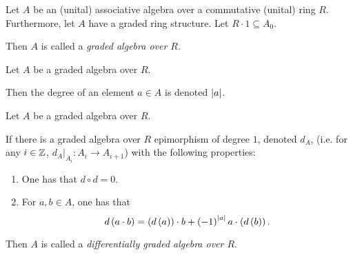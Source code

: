 \begin{definition}
    Let \( A \) be an (unital) associative algebra over a commutative (unital) ring \( R \). Furthermore, let \( A \) have a graded ring structure. Let \( R \cdot 1 \subseteq A_0 \).

    Then \( A \) is called a \emph{graded algebra over \( R \)}.
\end{definition}

\begin{notation}
    Let \( A \) be a graded algebra over \( R \).

    Then the degree of an element \( a \in A \) is denoted \emph{\( \lvert a \rvert \)}.
\end{notation}

\begin{definition}
    Let \( A \) be a graded algebra over \( R \).

    If there is a graded algebra over \( R \) epimorphism of degree \( 1 \), denoted \( d_A \), (i.e. for any \( i \in {\mathbb{Z}} \), \( d_A |_{A_i}: A_i \to A_{i + 1} \))
    with the following properties:
    \begin{enumerate}
        \item One has that \( d \circ d = 0 \).
        \item {
            For \( a, b \in A \), one has that
            \[
                d\left( a \cdot b \right)
                =
                \left( d\left( a \right) \right) \cdot b + \left( -1 \right)^{\lvert a \rvert}a \cdot \left( d\left( b \right) \right).
            \]
            }
    \end{enumerate}

    Then \( A \) is called a \emph{differentially graded algebra over \( R \)}.
\end{definition}

